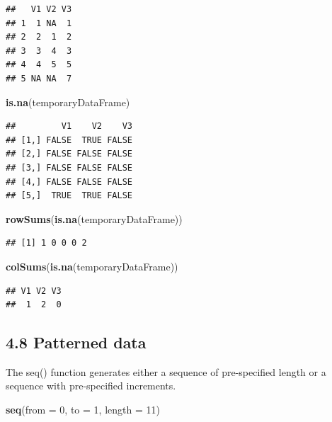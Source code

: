 \documentclass[]{article}
\newenvironment{Shaded}{\begin{snugshade}}{\end{snugshade}}
\newcommand{\KeywordTok}[1]{\textcolor[rgb]{0.13,0.29,0.53}{\textbf{#1}}}
\newcommand{\DataTypeTok}[1]{\textcolor[rgb]{0.13,0.29,0.53}{#1}}
\newcommand{\DecValTok}[1]{\textcolor[rgb]{0.00,0.00,0.81}{#1}}
\newcommand{\NormalTok}[1]{#1}
\begin{document}
\begin{verbatim}
##   V1 V2 V3
## 1  1 NA  1
## 2  2  1  2
## 3  3  4  3
## 4  4  5  5
## 5 NA NA  7
\end{verbatim}

\begin{Shaded}
\begin{Highlighting}[]
\KeywordTok{is.na}\NormalTok{(temporaryDataFrame)}
\end{Highlighting}
\end{Shaded}

\begin{verbatim}
##         V1    V2    V3
## [1,] FALSE  TRUE FALSE
## [2,] FALSE FALSE FALSE
## [3,] FALSE FALSE FALSE
## [4,] FALSE FALSE FALSE
## [5,]  TRUE  TRUE FALSE
\end{verbatim}

\begin{Shaded}
\begin{Highlighting}[]
\KeywordTok{rowSums}\NormalTok{(}\KeywordTok{is.na}\NormalTok{(temporaryDataFrame))}
\end{Highlighting}
\end{Shaded}

\begin{verbatim}
## [1] 1 0 0 0 2
\end{verbatim}

\begin{Shaded}
\begin{Highlighting}[]
\KeywordTok{colSums}\NormalTok{(}\KeywordTok{is.na}\NormalTok{(temporaryDataFrame))}
\end{Highlighting}
\end{Shaded}

\begin{verbatim}
## V1 V2 V3 
##  1  2  0
\end{verbatim}

\subsection{4.8 Patterned data}\label{patterned-data}

The seq() function generates either a sequence of pre-specified length
or a sequence with pre-specified increments.

\begin{Shaded}
\begin{Highlighting}[]
\KeywordTok{seq}\NormalTok{(}\DataTypeTok{from =} \DecValTok{0}\NormalTok{, }\DataTypeTok{to =} \DecValTok{1}\NormalTok{, }\DataTypeTok{length =} \DecValTok{11}\NormalTok{)}
\end{Highlighting}
\end{Shaded}
\end{document}
